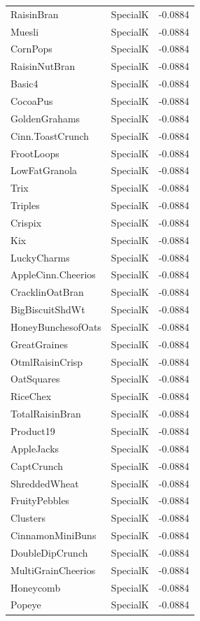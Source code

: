 \begin{table}[!htbp]
\begin{tabular}{lll}
RaisinBran & SpecialK & -0.0884
\\
Muesli & SpecialK & -0.0884
\\
CornPops & SpecialK & -0.0884
\\
RaisinNutBran & SpecialK & -0.0884
\\
Basic4 & SpecialK & -0.0884
\\
CocoaPus & SpecialK & -0.0884
\\
GoldenGrahams & SpecialK & -0.0884
\\
Cinn.ToastCrunch & SpecialK & -0.0884
\\
FrootLoops & SpecialK & -0.0884
\\
LowFatGranola & SpecialK & -0.0884
\\
Trix & SpecialK & -0.0884
\\
Triples & SpecialK & -0.0884
\\
Crispix & SpecialK & -0.0884
\\
Kix & SpecialK & -0.0884
\\
LuckyCharms & SpecialK & -0.0884
\\
AppleCinn.Cheerios & SpecialK & -0.0884
\\
CracklinOatBran & SpecialK & -0.0884
\\
BigBiscuitShdWt & SpecialK & -0.0884
\\
HoneyBunchesofOats & SpecialK & -0.0884
\\
GreatGraines & SpecialK & -0.0884
\\
OtmlRaisinCrisp & SpecialK & -0.0884
\\
OatSquares & SpecialK & -0.0884
\\
RiceChex & SpecialK & -0.0884
\\
TotalRaisinBran & SpecialK & -0.0884
\\
Product19 & SpecialK & -0.0884
\\
AppleJacks & SpecialK & -0.0884
\\
CaptCrunch & SpecialK & -0.0884
\\
ShreddedWheat & SpecialK & -0.0884
\\
FruityPebbles & SpecialK & -0.0884
\\
Clusters & SpecialK & -0.0884
\\
CinnamonMiniBuns & SpecialK & -0.0884
\\
DoubleDipCrunch & SpecialK & -0.0884
\\
MultiGrainCheerios & SpecialK & -0.0884
\\
Honeycomb & SpecialK & -0.0884
\\
Popeye & SpecialK & -0.0884

\end{tabular}
\end{table}

